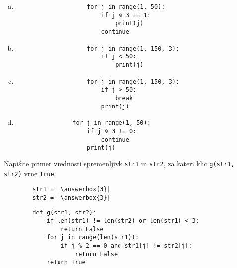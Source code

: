 \documentclass[arhiv, 10pt]{../izpit}
\newcommand{\inlinepy}[1]{\texttt{#1}}
\newcommand{\answerbox}[1]{\framebox{\vphantom{\large M}\hspace{#1cm}}}
\begin{document}
        \begin{multicols}{2}
        \begin{enumerate}[(a)]
\item 
                \begin{verbatim}
                    for j in range(1, 50):
                        if j % 3 == 1:
                            print(j)
                        continue
                \end{verbatim}
            
\item 
                \begin{verbatim}
                    for j in range(1, 150, 3):
                        if j < 50:
                            print(j)
                \end{verbatim}
            
\item 
                \begin{verbatim}
                    for j in range(1, 150, 3):
                        if j > 50:
                            break
                        print(j)
                \end{verbatim}
            
\item 
            \begin{verbatim}
                for j in range(1, 50):
                    if j % 3 != 0:
                        continue
                    print(j)
            \end{verbatim}
        
\end{enumerate}

        \end{multicols}
    
        \naloga*
        \begin{multicols}{2}
        \noindent
        Napišite primer vrednosti spremenljivk \inlinepy{str1} in \inlinepy{str2}, za kateri klic \inlinepy{g(str1, str2)} vrne \inlinepy{True}.
        \begin{verbatim}
        str1 = |\answerbox{3}|
        str2 = |\answerbox{3}|
        \end{verbatim}
        \vfil
        \columnbreak
        \begin{verbatim}
        def g(str1, str2):
            if len(str1) != len(str2) or len(str1) < 3:
                return False
            for j in range(len(str1)):
                if j % 2 == 0 and str1[j] != str2[j]:
                    return False
            return True
        \end{verbatim}
        \end{multicols}
    
\end{document}
